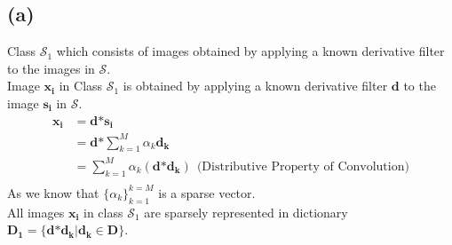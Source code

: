 \documentclass[fleqn, 11pt]{article}
\begin{document}
\subsection*{(a)}
Class $\mathcal{S}_1$ which consists of images obtained by applying a known derivative filter to the images in $\mathcal{S}$. \\
Image $\boldsymbol{x_i}$ in Class $\mathcal{S}_1$ is obtained by applying a known derivative filter $\boldsymbol{d}$ to the image $\boldsymbol{s_i}$ in $\mathcal{S}$. \\
\begin{equation*}
    \begin{aligned}
        \boldsymbol{x_i} &= \boldsymbol{d} \boldsymbol{*} \boldsymbol{s_i} \\
            &= \boldsymbol{d} \boldsymbol{*} \sum_{k=1}^{M} \alpha_k \boldsymbol{d_k} \\
            &= \sum_{k=1}^{M} \alpha_k (\boldsymbol{d} \boldsymbol{*} \boldsymbol{d_k}) \ \ (\text{Distributive Property of Convolution)}\\
    \end{aligned}
\end{equation*}
As we know that $\{\alpha_k\}_{k=1}^{k=M}$ is a sparse vector. \\
All images $\boldsymbol{x_i}$ in class $\mathcal{S}_1$ are sparsely represented in dictionary $\boldsymbol{D_1} = \{\boldsymbol{d} \boldsymbol{*} \boldsymbol{d_k} | \boldsymbol{d_k} \in \boldsymbol{D}\}$. \\

\medskip
\end{document}
